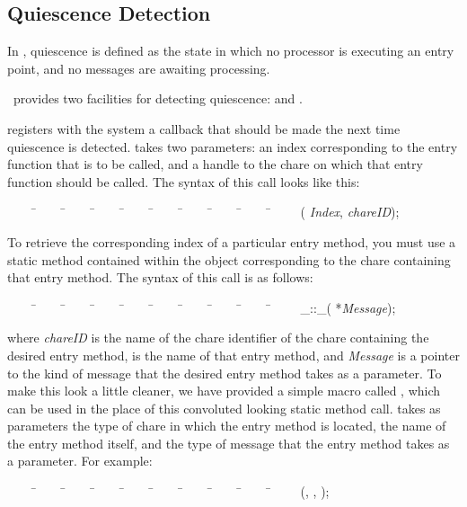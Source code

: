 \subsection{Quiescence Detection}

In \charmpp, quiescence is defined as the state in which no
processor is executing an entry point, and no messages are awaiting processing.

\charmpp\ provides two facilities for detecting quiescence:  and
.

 registers with the system a callback that should be made the
next time quiescence is detected.   takes two
parameters: an index corresponding to the entry function that is to be called,
and a handle to the chare on which that entry function should be called.  The
syntax of this call looks like this:

\begin{tabbing}
~~~~ \=~~~~ \=~~~~ \=~~~~ \=~~~~ \=~~~~ \=~~~~ \=~~~~ \=~~~~ \=~~~~ \kill
\> ( {\it Index},  {\it chareID});
\end{tabbing}

To retrieve the corresponding index of a particular entry
method, you must use a static method contained within the
 object corresponding to the chare
containing that entry method.  The syntax of this call is as follows:

\begin{tabbing}
~~~~ \=~~~~ \=~~~~ \=~~~~ \=~~~~ \=~~~~ \=~~~~ \=~~~~ \=~~~~ \=~~~~ \kill
{}\_::\_(
*{\it Message});
\end{tabbing}

where {\it chareID} is the name of the chare identifier of the chare containing
the desired entry method,  is the name of that entry method,
and {\it Message} is a pointer to the kind of message that the desired entry
method takes as a parameter. To make this look a little cleaner, we have
provided a simple macro called , which can be used in the place
of this convoluted looking static method call.
 takes as parameters the type of chare in
which the entry method is located, the name of the entry method itself, and the
type of message that the entry method takes as a parameter. For example:

\begin{tabbing}
~~~~ \=~~~~ \=~~~~ \=~~~~ \=~~~~ \=~~~~ \=~~~~ \=~~~~ \=~~~~ \=~~~~ \kill
\> (, , );
\end{tabbing}

